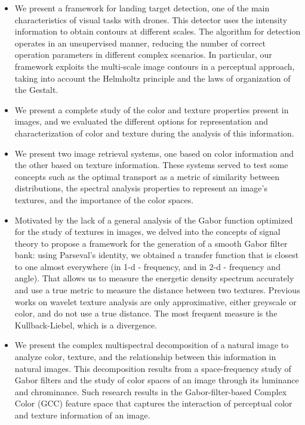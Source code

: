 \begin{itemize}
	\item We present a framework for landing target detection, one of the main characteristics of visual tasks with drones. This detector uses the intensity information to obtain contours at different scales. The algorithm for detection operates in an unsupervised manner, reducing the number of correct operation parameters in different complex scenarios. In particular, our framework exploits the multi-scale image contours in a perceptual approach, taking into account the Helmholtz principle and the laws of organization of the Gestalt.
	
	\item We present a complete study of the color and texture properties present in images, and we evaluated the different options for representation and characterization of color and texture during the analysis of this information.
	
	\item We present two image retrieval systems, one based on color information and the other based on texture information. These systems served to test some concepts such as the optimal transport as a metric of similarity between distributions, the spectral analysis properties to represent an image's textures, and the importance of the color spaces.
	
	\item Motivated by the lack of a general analysis of the Gabor function optimized for the study of textures in images, we delved into the concepts of signal theory to propose a framework for the generation of a smooth Gabor filter bank: using Parseval's identity, we obtained a transfer function that is closest to one almost everywhere (in 1-d - frequency, and in 2-d - frequency and angle). That allows us to measure the energetic density spectrum accurately and use a true metric to measure the distance between two textures. Previous works on wavelet texture analysis are only approximative, either greyscale or color, and do not use a true distance. The most frequent measure is the Kullback-Liebel, which is a divergence.
	
	\item We present the complex multispectral decomposition of a natural image to analyze color, texture, and the relationship between this information in natural images. This decomposition results from a space-frequency study of Gabor filters and the study of color spaces of an image through its luminance and chrominance. Such research results in the Gabor-filter-based Complex Color (GCC) feature space that captures the interaction of perceptual color and texture information of an image.
	

\end{itemize}
